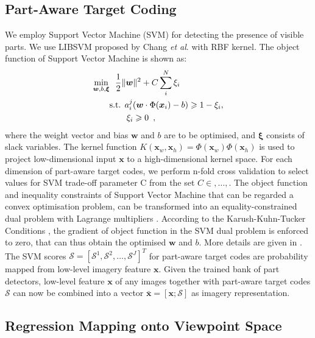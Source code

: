 \documentclass{tutmscthesis}[2010/09/22]
\numberwithin{equation}{section}
\numberwithin{table}{section}
\numberwithin{figure}{section}
\renewcommand{\vec}[1]{\bm{#1}}
\def\onedot{. }
\def\etal{\emph{et al}\onedot}
\begin{document}
\subsection{Part-Aware Target Coding}
\label{sec:target_coding}

We employ Support Vector Machine (SVM) for detecting the presence of visible parts.
We use LIBSVM proposed by Chang \etal \cite{chang2011libsvm} with RBF kernel. 
The object function of Support Vector Machine is shown as:
\begin{equation}
\begin{split}
  \min_{\vec{w},b,\vec{\xi}}&~~\frac{1}{2}\| \vec{w} \|^2+C\sum_i^N \xi_i\\
  &\hbox{s.t. } {a}_i^j(\vec{w}\cdot \Phi(\vec{x}_i)-b) \geqslant 1 - \xi_i ,\\
  &      ~~~~~~\xi_i \geqslant 0 \enspace,
\end{split}\label{eq:svm1}
\end{equation}
where the weight vector and bias $\vec{w}$ and $b$ are to be optimised,
and $\vec{\xi}$ consists of slack variables. 
The kernel function $K(\vec{x}_w,\vec{x}_h)=\Phi(\vec{x}_w)\Phi(\vec{x}_h)$ is used to project low-dimensional input $\vec{x}$ to a high-dimensional kernel space.
For each dimension of part-aware target codes, we perform n-fold cross validation to select values for SVM trade-off parameter C from the set $C ∈ {,\ldots,}$.
The object function and inequality constraints of Support Vector
Machine that can be regarded a convex optimisation problem, can be transformed into an
equality-constrained dual problem with Lagrange multipliers \cite{chen2016pedestrian}. 
According to the Karush-Kuhn-Tucker Conditions \cite{cortes1995support}, the
gradient of object function in the SVM dual problem is enforced to
zero, that can thus obtain the optimised $\vec{w}$ and $b$. More
details are given in \cite{chang2011libsvm}. 
The SVM scores $\mathcal{S} = [\mathcal{S}^1, \mathcal{S}^2, \ldots, \mathcal{S}^J]^T$ for part-aware target codes are probability mapped from low-level imagery feature $\vec{x}$. 
Given the trained bank of part detectors, low-level feature $\vec{x}$ of any images together with part-aware target codes $\mathcal{S}$ can now be combined into a vector $\bar{\vec{x}}=[\vec{x}; \mathcal{S}]$ as imagery representation. 




\subsection{Regression Mapping onto Viewpoint Space}
\label{sec:PATC_Regressor}
\end{document}
